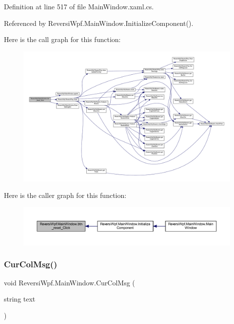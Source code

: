 Definition at line 517 of file Main\+Window.\+xaml.\+cs.



Referenced by Reversi\+Wpf.\+Main\+Window.\+Initialize\+Component().

Here is the call graph for this function\+:
\nopagebreak
\begin{figure}[H]
\begin{center}
\leavevmode
\includegraphics[width=350pt]{class_reversi_wpf_1_1_main_window_a9b7c6af889d570bc68dcd2cf981e4cf8_cgraph}
\end{center}
\end{figure}
Here is the caller graph for this function\+:
\nopagebreak
\begin{figure}[H]
\begin{center}
\leavevmode
\includegraphics[width=350pt]{class_reversi_wpf_1_1_main_window_a9b7c6af889d570bc68dcd2cf981e4cf8_icgraph}
\end{center}
\end{figure}
\mbox{\label{class_reversi_wpf_1_1_main_window_a5dd2bbfd5f17c36d1b301fdb91b483ad}} 
\subsubsection{\texorpdfstring{Cur\+Col\+Msg()}{CurColMsg()}}
{\footnotesize\ttfamily void Reversi\+Wpf.\+Main\+Window.\+Cur\+Col\+Msg (\begin{DoxyParamCaption}\item[{string}]{text }\end{DoxyParamCaption})}



